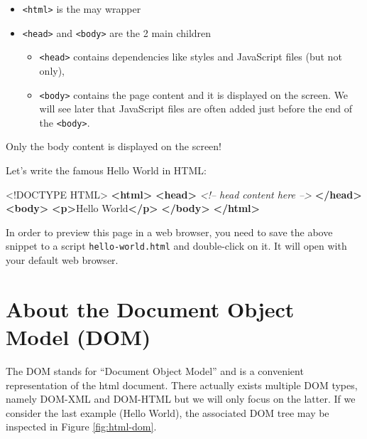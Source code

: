 \documentclass[
]{book}
\newenvironment{Shaded}{\begin{snugshade}}{\end{snugshade}}
\newcommand{\CommentTok}[1]{\textcolor[rgb]{0.56,0.35,0.01}{\textit{#1}}}
\newcommand{\DataTypeTok}[1]{\textcolor[rgb]{0.13,0.29,0.53}{#1}}
\newcommand{\KeywordTok}[1]{\textcolor[rgb]{0.13,0.29,0.53}{\textbf{#1}}}
\newcommand{\NormalTok}[1]{#1}
\providecommand{\tightlist}{%
  \setlength{\itemsep}{0pt}\setlength{\parskip}{0pt}}
\begin{document}
\begin{itemize}
\tightlist
\item
  \texttt{\textless{}html\textgreater{}} is the may wrapper
\item
  \texttt{\textless{}head\textgreater{}} and \texttt{\textless{}body\textgreater{}} are the 2 main children

  \begin{itemize}
  \tightlist
  \item
    \texttt{\textless{}head\textgreater{}} contains dependencies like styles and JavaScript files (but not only),
  \item
    \texttt{\textless{}body\textgreater{}} contains the page content and it is displayed on the screen. We will see later that JavaScript files are often added just before the end of the \texttt{\textless{}body\textgreater{}}.
  \end{itemize}
\end{itemize}

Only the body content is displayed on the screen!

Let's write the famous Hello World in HTML:

\begin{Shaded}
\begin{Highlighting}[]
\DataTypeTok{<!DOCTYPE }\NormalTok{HTML}\DataTypeTok{>}
\KeywordTok{<html>}
  \KeywordTok{<head>}
  \CommentTok{<!-- head content here -->}
  \KeywordTok{</head>}
  \KeywordTok{<body>}
  \KeywordTok{<p>}\NormalTok{Hello World}\KeywordTok{</p>}
  \KeywordTok{</body>}
\KeywordTok{</html>}
\end{Highlighting}
\end{Shaded}

In order to preview this page in a web browser, you need to save the above snippet to a script \texttt{hello-world.html} and double-click on it. It will open with your default web browser.

\hypertarget{about-the-document-object-model-dom}{%
\section{About the Document Object Model (DOM)}\label{about-the-document-object-model-dom}}

The DOM stands for ``Document Object Model'' and is a convenient representation of the html document. There actually exists multiple DOM types, namely DOM-XML and DOM-HTML but we will only focus on the latter. If we consider the last example (Hello World), the associated DOM tree may be inspected in Figure \ref{fig:html-dom}.
\end{document}
